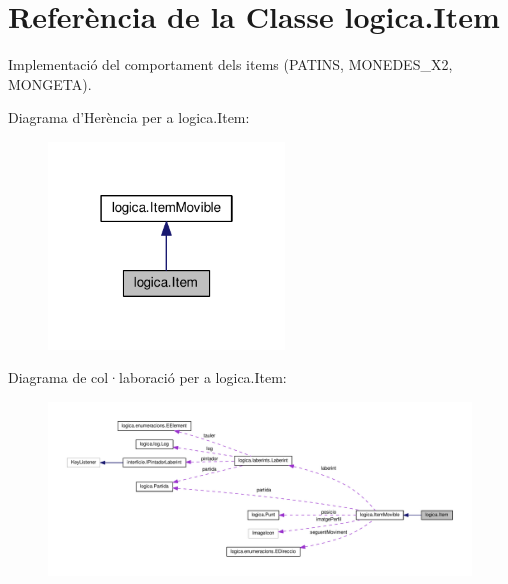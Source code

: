 \hypertarget{classlogica_1_1_item}{\section{Referència de la Classe logica.\+Item}
\label{classlogica_1_1_item}
}


Implementació del comportament dels items (P\+A\+T\+I\+N\+S, M\+O\+N\+E\+D\+E\+S\+\_\+\+X2, M\+O\+N\+G\+E\+T\+A).  




Diagrama d'Herència per a logica.\+Item\+:\nopagebreak
\begin{figure}[H]
\begin{center}
\leavevmode
\includegraphics[width=178pt]{classlogica_1_1_item__inherit__graph}
\end{center}
\end{figure}


Diagrama de col·laboració per a logica.\+Item\+:
\nopagebreak
\begin{figure}[H]
\begin{center}
\leavevmode
\includegraphics[width=350pt]{classlogica_1_1_item__coll__graph}
\end{center}
\end{figure}
